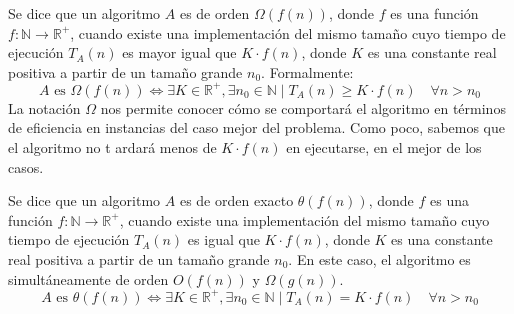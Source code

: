 \begin{definicion}
Se dice que un algoritmo $A$ es de orden $\Omega(f(n))$, donde $f$ es una función $f:\mathbb{N}\rightarrow \mathbb{R}^{+}$, cuando existe una implementación del mismo tamaño cuyo tiempo de ejecución $T_A(n)$ es mayor igual que $K \cdot f(n)$, donde $K$ es una constante real positiva a partir de un tamaño grande $n_0$. Formalmente:
\begin{equation*}
A \text{\ es\ } \Omega(f(n)) \Leftrightarrow \exists K \in \mathbb{R}^{+}, \exists n_0 \in \mathbb{N} \mid T_A(n) \geq K \cdot f(n)\quad\forall n > n_0
\end{equation*}
La notación $\Omega$ nos permite conocer cómo se comportará el algoritmo en términos de eficiencia en instancias del caso mejor del problema.
Como poco, sabemos que el algoritmo no t ardará menos de $K\cdot f(n)$ en ejecutarse, en el mejor de los casos.
\end{definicion}

\begin{definicion}
Se dice que un algoritmo $A$ es de orden exacto $\theta(f(n))$, donde $f$ es una función $f:\mathbb{N}\rightarrow \mathbb{R}^{+}$, cuando existe una implementación del mismo tamaño cuyo tiempo de ejecución $T_A(n)$ es igual que $K \cdot f(n)$, donde $K$ es una constante real positiva a partir de un tamaño grande $n_0$. En este caso, el algoritmo es simultáneamente de orden $O(f(n))$ y $\Omega(g(n))$.
\begin{equation*}
A \text{\ es\ } \theta(f(n)) \Leftrightarrow \exists K \in \mathbb{R}^{+}, \exists n_0 \in \mathbb{N} \mid T_A(n) = K \cdot f(n)\quad\forall n > n_0
\end{equation*}
\end{definicion}

